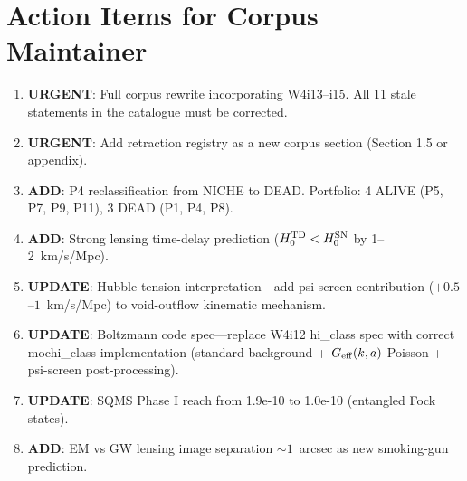 \documentclass[11pt]{article}
\newcommand{\Geff}{G_{\rm eff}}
\begin{document}
\section*{Action Items for Corpus Maintainer}

\begin{enumerate}
\item \textbf{URGENT}: Full corpus rewrite incorporating W4i13--i15.
  All 11 stale statements in the catalogue must be corrected.

\item \textbf{URGENT}: Add retraction registry as a new corpus section
  (Section 1.5 or appendix).

\item \textbf{ADD}: P4 reclassification from NICHE to DEAD.
  Portfolio: 4 ALIVE (P5, P7, P9, P11), 3 DEAD (P1, P4, P8).

\item \textbf{ADD}: Strong lensing time-delay prediction
  ($H_0^{\rm TD} < H_0^{\rm SN}$ by 1--2~km/s/Mpc).

\item \textbf{UPDATE}: Hubble tension interpretation---add psi-screen
  contribution ($+0.5$--$1$~km/s/Mpc) to void-outflow kinematic
  mechanism.

\item \textbf{UPDATE}: Boltzmann code spec---replace W4i12 hi\_class
  spec with correct mochi\_class implementation (standard background +
  $\Geff(k,a)$ Poisson + psi-screen post-processing).

\item \textbf{UPDATE}: SQMS Phase I reach from 1.9e-10 to 1.0e-10
  (entangled Fock states).

\item \textbf{ADD}: EM vs GW lensing image separation $\sim 1$~arcsec
  as new smoking-gun prediction.
\end{enumerate}
\end{document}
